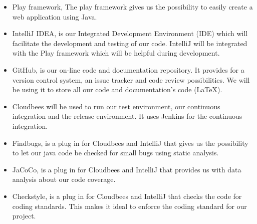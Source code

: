 \begin{itemize}
\item Play framework,
The play framework gives us the possibility to easily create a web application using Java.
\item IntelliJ IDEA, is our Integrated Development Environment (IDE) which will facilitate the development and testing of our code.
IntelliJ will be integrated with the Play framework which will be helpful during development.
\item GitHub, is our on-line code and documentation repository.
It provides for a version control system, an issue tracker and code review possibilities.
We will be using it to store all our code and documentation's code (LaTeX).
\item Cloudbees will be used to run our test environment, our continuous integration and the release environment.
It uses Jenkins for the continuous integration.
\item Findbugs, is a plug in for Cloudbees and IntelliJ that gives us the possibility to let our java code be checked for small bugs using static analysis.
\item JaCoCo, is a plug in for Cloudbees and IntelliJ that provides us with data analysis about our code coverage.
\item Checkstyle, is a plug in for Cloudbees and IntelliJ that checks the code for coding standards.
This makes it ideal to enforce the coding standard for our project.
\end{itemize}
